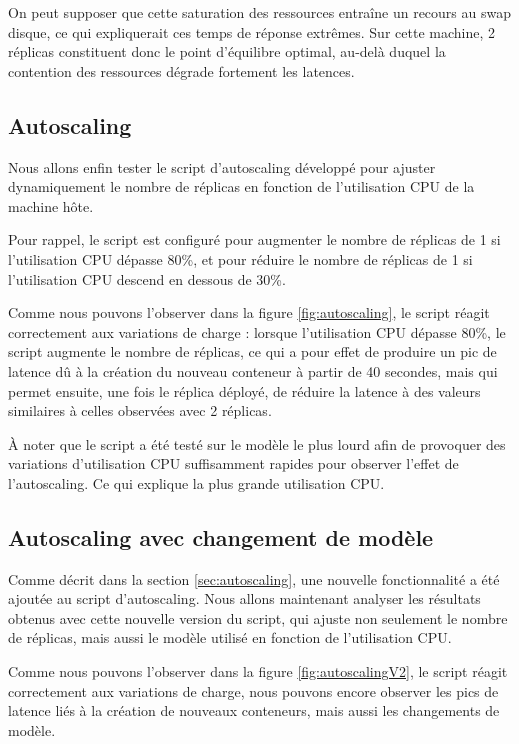 \documentclass{rapportClass} %
\begin{document}
On peut supposer que cette saturation des ressources entraîne un recours au swap disque,
ce qui expliquerait ces temps de réponse extrêmes.
Sur cette machine, 2 réplicas constituent donc le point d'équilibre optimal, 
au-delà duquel la contention des ressources dégrade fortement les latences.


\subsection{Autoscaling}
\label{sec:results-autoscaling}
Nous allons enfin tester le script d'autoscaling développé pour ajuster dynamiquement le nombre de réplicas 
en fonction de l'utilisation CPU de la machine hôte.

\smallskip
Pour rappel, le script est configuré pour augmenter le nombre de réplicas de 1 si l'utilisation CPU dépasse 80\%, 
et pour réduire le nombre de réplicas de 1 si l'utilisation CPU descend en dessous de 30\%.

Comme nous pouvons l'observer dans la figure \ref{fig:autoscaling}, le script réagit correctement aux variations de charge :
lorsque l'utilisation CPU dépasse 80\%, le script augmente le nombre de réplicas, ce qui a pour effet de produire 
un pic de latence dû à la création du nouveau conteneur à partir de 40 secondes, mais qui permet ensuite, 
une fois le réplica déployé, de réduire la latence à des valeurs similaires à celles observées avec 2 réplicas.

À noter que le script a été testé sur le modèle le plus lourd afin de provoquer des variations d'utilisation CPU 
suffisamment rapides pour observer l'effet de l'autoscaling. 
Ce qui explique la plus grande utilisation CPU.

\subsection{Autoscaling avec changement de modèle}
Comme décrit dans la section \ref{sec:autoscaling}, une nouvelle fonctionnalité a été ajoutée au script d'autoscaling.
Nous allons maintenant analyser les résultats obtenus avec cette nouvelle version du script, 
qui ajuste non seulement le nombre de réplicas, mais aussi le modèle utilisé en fonction de l'utilisation CPU.

Comme nous pouvons l'observer dans la figure \ref{fig:autoscalingV2}, le script réagit correctement 
aux variations de charge, nous pouvons encore observer les pics de latence liés à la création de nouveaux conteneurs, 
mais aussi les changements de modèle.
\end{document}

